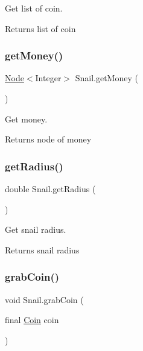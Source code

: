 Get list of coin.

\begin{DoxyReturn}{Returns}
list of coin 
\end{DoxyReturn}
\mbox{\label{class_snail_ad57c8cb98f65b980483ce326bc7e6031}} 
\subsubsection{\texorpdfstring{get\+Money()}{getMoney()}}
{\footnotesize\ttfamily \mbox{\hyperlink{class_node}{Node}}$<$Integer$>$ Snail.\+get\+Money (\begin{DoxyParamCaption}{ }\end{DoxyParamCaption})\hspace{0.3cm}{\ttfamily [inline]}}

Get money.

\begin{DoxyReturn}{Returns}
node of money 
\end{DoxyReturn}
\mbox{\label{class_snail_a6b26b21e7bf3702c9e263cae1a9bc3ad}} 
\subsubsection{\texorpdfstring{get\+Radius()}{getRadius()}}
{\footnotesize\ttfamily double Snail.\+get\+Radius (\begin{DoxyParamCaption}{ }\end{DoxyParamCaption})\hspace{0.3cm}{\ttfamily [inline]}}

Get snail radius.

\begin{DoxyReturn}{Returns}
snail radius 
\end{DoxyReturn}
\mbox{\label{class_snail_ad077a58207472113fae8ec37696d83e3}} 
\subsubsection{\texorpdfstring{grab\+Coin()}{grabCoin()}}
{\footnotesize\ttfamily void Snail.\+grab\+Coin (\begin{DoxyParamCaption}\item[{final \mbox{\hyperlink{class_coin}{Coin}}}]{coin }\end{DoxyParamCaption})\hspace{0.3cm}{\ttfamily [inline]}}


